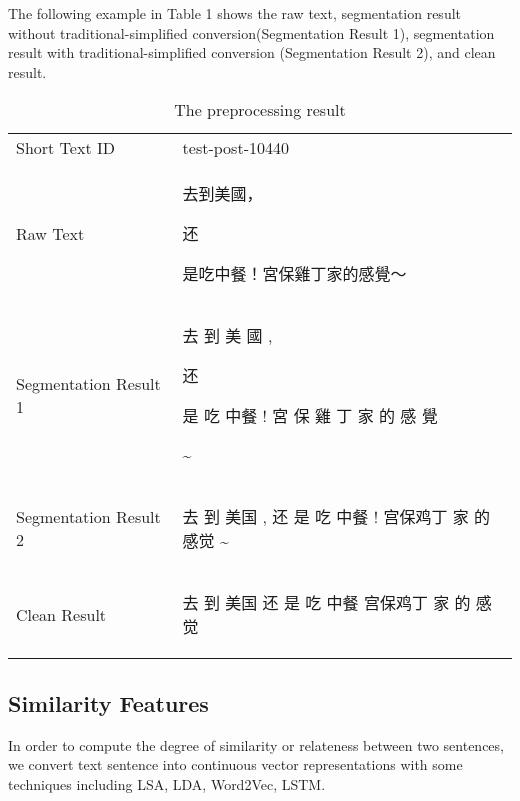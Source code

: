 \documentclass{llncs}
\begin{document}
The following example in Table 1 shows the raw text,  
segmentation result without traditional-simplified conversion(Segmentation 
Result 1), segmentation result with traditional-simplified conversion
(Segmentation Result 2), and clean result.
\begin{table}
\centering
\caption{The preprocessing result}
\begin{tabular}{l@{\qquad}l}
\hline\noalign{\smallskip}
Short Text ID & test-post-10440 \\
\noalign{\smallskip}
\hline
\noalign{\smallskip}
Raw Text          & \begin{CJK}{UTF8}{bsmi}去到美國，\begin{CJK}{UTF8}{gbsn}还\end{CJK}是吃中餐！宮保雞丁家的感覺～\end{CJK}  \\
\hline
\noalign{\smallskip}
Segmentation Result 1  & \begin{CJK}{UTF8}{bsmi}去 到 美 國 , \begin{CJK}{UTF8}{gbsn}还\end{CJK} 是 吃 中餐 ! 宮 保 雞 丁 家 的 感 覺 \end{CJK} \~{} \\
\hline
\noalign{\smallskip}
Segmentation Result 2   & \begin{CJK}{UTF8}{gbsn}去 到 美国 , 还 是 吃 中餐 ! 宫保鸡丁 家 的 感觉 \~{}\end{CJK}   \\
\hline
\noalign{\smallskip}
Clean Result   & \begin{CJK}{UTF8}{gbsn}去 到 美国 还 是 吃 中餐 宫保鸡丁 家 的 感觉\end{CJK}   \\
\hline
\end{tabular}
\end{table}


\subsection{Similarity Features}
In order to compute the degree of similarity or relateness between two 
sentences, we convert text sentence into continuous vector representations 
with some techniques including LSA, LDA, Word2Vec, LSTM.
\end{document}
